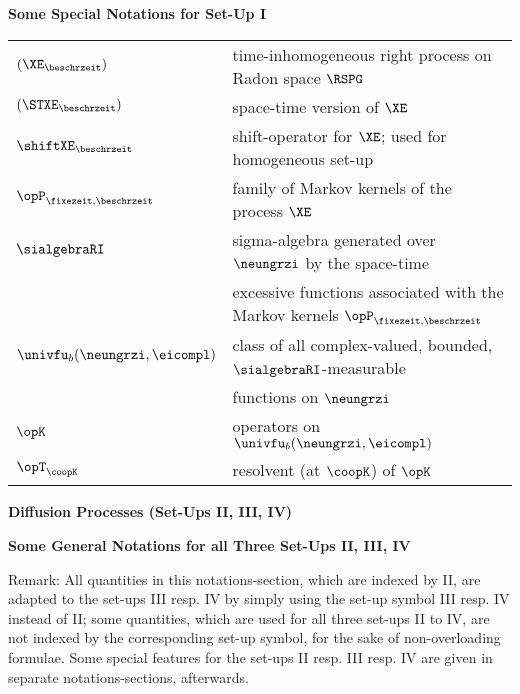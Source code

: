 {\bf Some Special Notations for Set-Up I}


\begin{longtable}{ll}

$(\XE_{\beschrzeit})$ & time-inhomogeneous right process on Radon space $\RSPG$ 
\\
$(\STXE_{\beschrzeit})$ & space-time version of $\XE$ 
\\
$\shiftXE_{\beschrzeit}$ & shift-operator for $\XE$; used for   homogeneous set-up 
\\
$\opP_{\fixezeit,\beschrzeit}$ &  family of Markov kernels of the process $\XE$ 
\\
$\sialgebraRI$ & sigma-algebra generated over $\neungrzi$ by the space-time  
\\
$\ $ & excessive functions associated with the Markov kernels $\opP_{\fixezeit,\beschrzeit}$ 
\\
$\univfu_{b}(\neungrzi,\eicompl)$  & class of all 
complex-valued, bounded, ${\sialgebraRI}$-measurable  
 
\\
$\ $ & functions on $\neungrzi$
\\
$\opK$ &  operators on $\univfu_{b}(\neungrzi,\eicompl)$ 
\\
$\opT_{\coopK}$ & resolvent (at $\coopK$) of $\opK$  
\\

\end{longtable}


{
\large 
\bf Diffusion Processes (Set-Ups II, III, IV)}



{\bf Some General Notations for all Three Set-Ups II, III, IV}

Remark: All quantities in this notations-section,  which are indexed by II, are adapted to the set-ups
III resp. IV by simply using the set-up symbol III resp. IV instead
of II;
some quantities, which are used for all three set-ups II to IV, are not indexed by the corresponding set-up symbol, for the sake of non-overloading formulae. Some special features for the
set-ups II resp. III resp. IV are given in separate 
 notations-sections, afterwards. 

